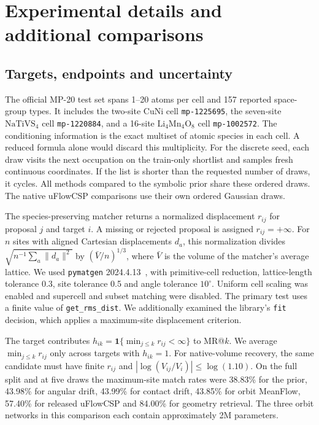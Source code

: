 \section{Experimental details and additional comparisons}\label{sec:csp-details}

\subsection{Targets, endpoints and uncertainty}

The official MP-20 test set spans 1--20 atoms per cell and 157 reported space-group types. It includes the two-site CuNi cell \texttt{mp-1225695}, the seven-site $\mathrm{NaTiVS}_4$ cell \texttt{mp-1220884}, and a 16-site $\mathrm{Li}_4\mathrm{Mn}_4\mathrm{O}_8$ cell \texttt{mp-1002572}. The conditioning information is the exact multiset of atomic species in each cell. A reduced formula alone would discard this multiplicity. For the discrete seed, each draw visits the next occupation on the train-only shortlist and samples fresh continuous coordinates. If the list is shorter than the requested number of draws, it cycles. All methods compared to the symbolic prior share these ordered draws. The native uFlowCSP comparisons use their own ordered Gaussian draws.

The species-preserving matcher returns a normalized displacement $r_{ij}$ for proposal $j$ and target $i$. A missing or rejected proposal is assigned $r_{ij}=+\infty$. For $n$ sites with aligned Cartesian displacements $d_a$, this normalization divides $\sqrt{n^{-1}\sum_a \|d_a\|^2}$ by $(\bar V/n)^{1/3}$, where $\bar V$ is the volume of the matcher's average lattice. We used \texttt{pymatgen} 2024.4.13~\cite{pymatgen}, with primitive-cell reduction, lattice-length tolerance 0.3, site tolerance 0.5 and angle tolerance $10^\circ$. Uniform cell scaling was enabled and supercell and subset matching were disabled. The primary test uses a finite value of \texttt{get\_rms\_dist}. We additionally examined the library's \texttt{fit} decision, which applies a maximum-site displacement criterion.

The target contributes $h_{ik}=\mathbf{1}\{\min_{j\leq k}r_{ij}<\infty\}$ to MR@$k$. We average $\min_{j\leq k}r_{ij}$ only across targets with $h_{ik}=1$. For native-volume recovery, the same candidate must have finite $r_{ij}$ and $|\log(V_{ij}/V_i)|\leq\log(1.10)$. On the full split and at five draws the maximum-site match rates were 38.83\% for the prior, 43.98\% for angular drift, 43.99\% for contact drift, 43.85\% for orbit MeanFlow, 57.40\% for released uFlowCSP and 84.00\% for geometry retrieval. The three orbit networks in this comparison each contain approximately 2M parameters.

